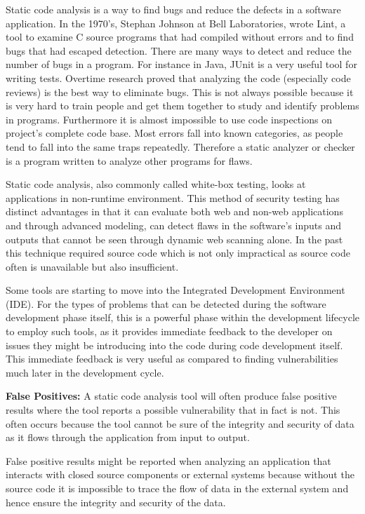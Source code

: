 Static code analysis is a way to find bugs and reduce the defects in a software application. In the 1970's, Stephan Johnson at Bell Laboratories, wrote Lint, a tool to examine C
source programs that had compiled without errors and to find bugs that had escaped detection. There are many ways to detect and reduce the number of bugs in a program. For instance in Java, JUnit is a very useful tool for writing tests. Overtime research proved that analyzing the code (especially code reviews) is the best way to eliminate bugs. This is not
always possible because it is very hard to train people and get them together to study and identify problems in programs. Furthermore it is almost impossible to use code inspections on project's complete code base.
Most errors fall into known categories, as people tend to fall into the same traps repeatedly. Therefore a static analyzer or checker is a program written to analyze other programs for flaws. 

Static code analysis, also commonly called white-box testing, looks at applications in non-runtime environment. This method of security testing has distinct advantages in that it can evaluate both web and non-web applications and through advanced modeling, can detect flaws in the software's inputs and outputs that cannot be seen through dynamic web scanning alone. In the past this technique required source code which is not only impractical as source code often is unavailable but also insufficient.

Some tools are starting to move into the Integrated Development Environment (IDE). For the types of problems that can be detected during the software development phase itself, this is a powerful phase within the development lifecycle to employ such tools, as it provides immediate feedback to the developer on issues they might be introducing into the code during code development itself. This immediate feedback is very useful as compared to finding vulnerabilities much later in the development cycle.

\textbf{False Positives:}
A static code analysis tool will often produce false positive results where the tool reports a possible vulnerability that in fact is not. This often occurs because the tool cannot be sure of the integrity and security of data as it flows through the application from input to output.

False positive results might be reported when analyzing an application that interacts with closed source components or external systems because without the source code it is impossible to trace the flow of data in the external system and hence ensure the integrity and security of the data.

